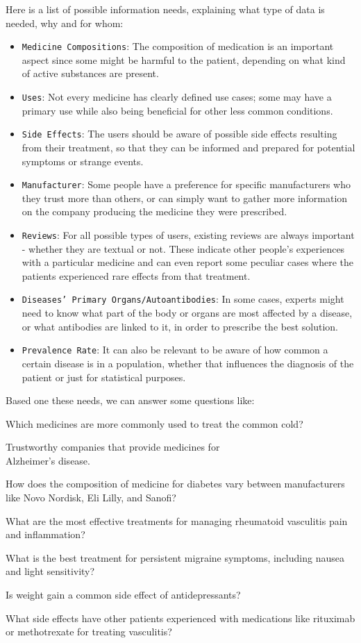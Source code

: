 \documentclass[sigconf]{acmart}
\begin{document}
Here is a list of possible information needs, explaining what type of data is needed, why and for whom:
\begin{itemize}
	\item {\texttt{Medicine Compositions}}: The composition of medication is an important aspect since some might be harmful to the patient, depending on what kind of active substances are present.
	\item {\texttt{Uses}}: Not every medicine has clearly defined use cases; some may have a primary use while also being beneficial for other less common conditions.
	\item {\texttt{Side Effects}}: The users should be aware of possible side effects resulting from their treatment, so that they can be informed and prepared for potential symptoms or strange events.
	\item {\texttt{Manufacturer}}: Some people have a preference for specific manufacturers who they trust more than others, or can simply want to gather more information on the company producing the medicine they were prescribed.
	\item {\texttt{Reviews}}: For all possible types of users, existing reviews are always important - whether they are textual or not. These indicate other people's experiences with a particular medicine and can even report some peculiar cases where the patients experienced rare effects from that treatment.
	\item {\texttt{Diseases' Primary Organs/Autoantibodies}}: In some cases, experts might need to know what part of the body or organs are most affected by a disease, or what antibodies are linked to it, in order to prescribe the best solution.
	\item {\texttt{Prevalence Rate}}: It can also be relevant to be aware of how common a certain disease is in a population, whether that influences the diagnosis of the patient or just for statistical purposes.
\end{itemize}

Based one these needs, we can answer some questions like: 
\begin{arrowlist}
	\item Which medicines are more commonly used to treat the common cold?
        \item Trustworthy companies that provide medicines for \\Alzheimer’s disease. 
	\item How does the composition of medicine for diabetes vary between manufacturers like Novo Nordisk, Eli Lilly, and Sanofi?
	\item What are the most effective treatments for managing rheumatoid vasculitis pain and inflammation?
	\item What is the best treatment for persistent migraine symptoms, including nausea and light sensitivity?
	\item Is weight gain a common side effect of antidepressants?
	\item What side effects have other patients experienced with medications like rituximab or methotrexate for treating vasculitis?
\end{arrowlist}
\end{document}
